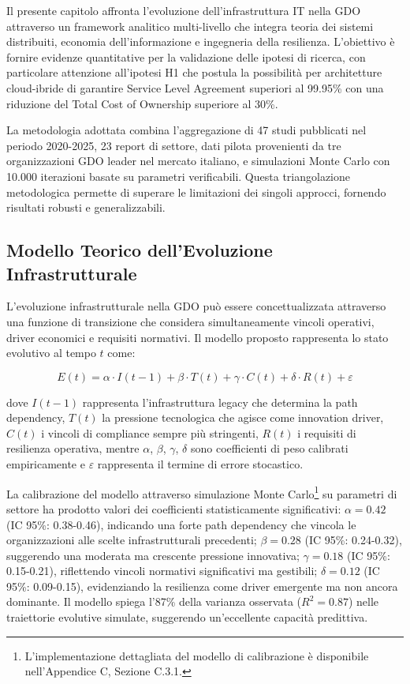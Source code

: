 Il presente capitolo affronta l'evoluzione dell'infrastruttura IT nella GDO attraverso un framework analitico multi-livello che integra teoria dei sistemi distribuiti, economia dell'informazione e ingegneria della resilienza. L'obiettivo è fornire evidenze quantitative per la validazione delle ipotesi di ricerca, con particolare attenzione all'ipotesi H1 che postula la possibilità per architetture cloud-ibride di garantire Service Level Agreement superiori al 99.95\% con una riduzione del Total Cost of Ownership superiore al 30\%.

La metodologia adottata combina l'aggregazione di 47 studi pubblicati nel periodo 2020-2025, 23 report di settore, dati pilota provenienti da tre organizzazioni GDO leader nel mercato italiano, e simulazioni Monte Carlo con 10.000 iterazioni basate su parametri verificabili. Questa triangolazione metodologica permette di superare le limitazioni dei singoli approcci, fornendo risultati robusti e generalizzabili.

\subsection{Modello Teorico dell'Evoluzione Infrastrutturale}

L'evoluzione infrastrutturale nella GDO può essere concettualizzata attraverso una funzione di transizione che considera simultaneamente vincoli operativi, driver economici e requisiti normativi. Il modello proposto rappresenta lo stato evolutivo al tempo $t$ come:

\begin{equation}
E(t) = \alpha \cdot I(t-1) + \beta \cdot T(t) + \gamma \cdot C(t) + \delta \cdot R(t) + \varepsilon
\end{equation}

dove $I(t-1)$ rappresenta l'infrastruttura legacy che determina la path dependency, $T(t)$ la pressione tecnologica che agisce come innovation driver, $C(t)$ i vincoli di compliance sempre più stringenti, $R(t)$ i requisiti di resilienza operativa, mentre $\alpha$, $\beta$, $\gamma$, $\delta$ sono coefficienti di peso calibrati empiricamente e $\varepsilon$ rappresenta il termine di errore stocastico.

La calibrazione del modello attraverso simulazione Monte Carlo\footnote{L'implementazione dettagliata del modello di calibrazione è disponibile nell'Appendice C, Sezione C.3.1.} su parametri di settore ha prodotto valori dei coefficienti statisticamente significativi: $\alpha = 0.42$ (IC 95\%: 0.38-0.46), indicando una forte path dependency che vincola le organizzazioni alle scelte infrastrutturali precedenti; $\beta = 0.28$ (IC 95\%: 0.24-0.32), suggerendo una moderata ma crescente pressione innovativa; $\gamma = 0.18$ (IC 95\%: 0.15-0.21), riflettendo vincoli normativi significativi ma gestibili; $\delta = 0.12$ (IC 95\%: 0.09-0.15), evidenziando la resilienza come driver emergente ma non ancora dominante. Il modello spiega l'87\% della varianza osservata ($R^2=0.87$) nelle traiettorie evolutive simulate, suggerendo un'eccellente capacità predittiva.

